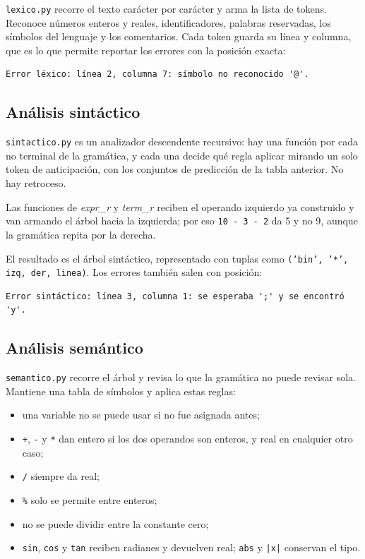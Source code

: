 \documentclass[12pt,letterpaper]{article}
\newcommand{\tk}[1]{\texttt{#1}}
\newcommand{\nt}[1]{\textit{#1}}
\begin{document}
\tk{lexico.py} recorre el texto carácter por carácter y arma la lista de tokens. Reconoce números enteros y reales, identificadores, palabras reservadas, los símbolos del lenguaje y los comentarios. Cada token guarda su línea y columna, que es lo que permite reportar los errores con la posición exacta:

\begin{lstlisting}
Error léxico: línea 2, columna 7: símbolo no reconocido '@'.
\end{lstlisting}

\subsection{Análisis sintáctico}

\tk{sintactico.py} es un analizador descendente recursivo: hay una función por cada no terminal de la gramática, y cada una decide qué regla aplicar mirando un solo token de anticipación, con los conjuntos de predicción de la tabla anterior. No hay retroceso.

Las funciones de \nt{expr\_r} y \nt{term\_r} reciben el operando izquierdo ya construido y van armando el árbol hacia la izquierda; por eso \tk{10 - 3 - 2} da 5 y no 9, aunque la gramática repita por la derecha.

El resultado es el árbol sintáctico, representado con tuplas como \tk{('bin', '*', izq, der, linea)}. Los errores también salen con posición:

\begin{lstlisting}
Error sintáctico: línea 3, columna 1: se esperaba ';' y se encontró 'y'.
\end{lstlisting}

\subsection{Análisis semántico}

\tk{semantico.py} recorre el árbol y revisa lo que la gramática no puede revisar sola. Mantiene una tabla de símbolos y aplica estas reglas:

\begin{itemize}
  \item una variable no se puede usar si no fue asignada antes;
  \item \tk{+}, \tk{-} y \tk{*} dan entero si los dos operandos son enteros, y real en cualquier otro caso;
  \item \tk{/} siempre da real;
  \item \tk{\%} solo se permite entre enteros;
  \item no se puede dividir entre la constante cero;
  \item \tk{sin}, \tk{cos} y \tk{tan} reciben radianes y devuelven real; \tk{abs} y \tk{|x|} conservan el tipo.
\end{itemize}
\end{document}
